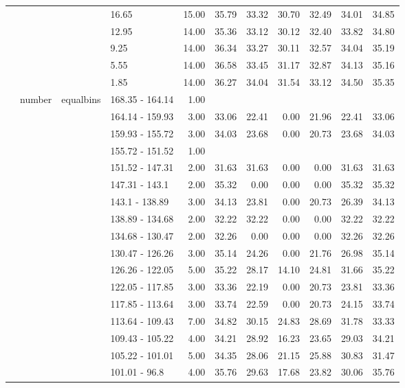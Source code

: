 \begin{longtable}{llllrrrrrrr}
   &  &  & 16.65 & 15.00 & 35.79 & 33.32 & 30.70 & 32.49 & 34.01 & 34.85 \\ 
   &  &  & 12.95 & 14.00 & 35.36 & 33.12 & 30.12 & 32.40 & 33.82 & 34.80 \\ 
   &  &  & 9.25 & 14.00 & 36.34 & 33.27 & 30.11 & 32.57 & 34.04 & 35.19 \\ 
   &  &  & 5.55 & 14.00 & 36.58 & 33.45 & 31.17 & 32.87 & 34.13 & 35.16 \\ 
   &  &  & 1.85 & 14.00 & 36.27 & 34.04 & 31.54 & 33.12 & 34.50 & 35.35 \\ 
   & number & equalbins & 168.35 - 164.14 & 1.00 &  &  &  &  &  &  \\ 
   &  &  & 164.14 - 159.93 & 3.00 & 33.06 & 22.41 & 0.00 & 21.96 & 22.41 & 33.06 \\ 
   &  &  & 159.93 - 155.72 & 3.00 & 34.03 & 23.68 & 0.00 & 20.73 & 23.68 & 34.03 \\ 
   &  &  & 155.72 - 151.52 & 1.00 &  &  &  &  &  &  \\ 
   &  &  & 151.52 - 147.31 & 2.00 & 31.63 & 31.63 & 0.00 & 0.00 & 31.63 & 31.63 \\ 
   &  &  & 147.31 - 143.1 & 2.00 & 35.32 & 0.00 & 0.00 & 0.00 & 35.32 & 35.32 \\ 
   &  &  & 143.1 - 138.89 & 3.00 & 34.13 & 23.81 & 0.00 & 20.73 & 26.39 & 34.13 \\ 
   &  &  & 138.89 - 134.68 & 2.00 & 32.22 & 32.22 & 0.00 & 0.00 & 32.22 & 32.22 \\ 
   &  &  & 134.68 - 130.47 & 2.00 & 32.26 & 0.00 & 0.00 & 0.00 & 32.26 & 32.26 \\ 
   &  &  & 130.47 - 126.26 & 3.00 & 35.14 & 24.26 & 0.00 & 21.76 & 26.98 & 35.14 \\ 
   &  &  & 126.26 - 122.05 & 5.00 & 35.22 & 28.17 & 14.10 & 24.81 & 31.66 & 35.22 \\ 
   &  &  & 122.05 - 117.85 & 3.00 & 33.36 & 22.19 & 0.00 & 20.73 & 23.81 & 33.36 \\ 
   &  &  & 117.85 - 113.64 & 3.00 & 33.74 & 22.59 & 0.00 & 20.73 & 24.15 & 33.74 \\ 
   &  &  & 113.64 - 109.43 & 7.00 & 34.82 & 30.15 & 24.83 & 28.69 & 31.78 & 33.33 \\ 
   &  &  & 109.43 - 105.22 & 4.00 & 34.21 & 28.92 & 16.23 & 23.65 & 29.03 & 34.21 \\ 
   &  &  & 105.22 - 101.01 & 5.00 & 34.35 & 28.06 & 21.15 & 25.88 & 30.83 & 31.47 \\ 
   &  &  & 101.01 - 96.8 & 4.00 & 35.76 & 29.63 & 17.68 & 23.82 & 30.06 & 35.76 \\ 

\end{longtable}

